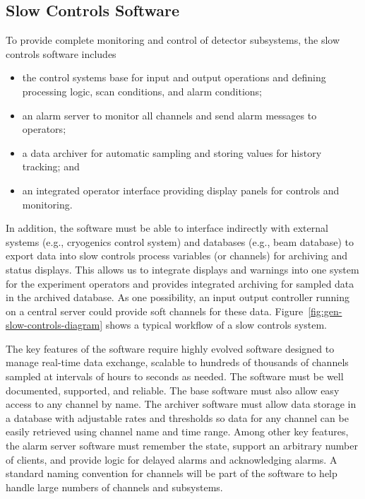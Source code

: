 \subsection{Slow Controls Software}
\label{sec:fdgen-slow-cryo-sw}


To provide complete monitoring and control of detector subsystems, the slow controls software includes
%
\begin{itemize}
 \item the control systems base for input and output operations
  and defining processing logic, scan conditions, and alarm conditions;
 \item an alarm server to monitor all channels and send alarm
  messages to operators;
 \item a data archiver for automatic sampling and storing values for history tracking; and 
 \item an integrated operator interface providing display panels for
  controls and monitoring.
\end{itemize}

In addition, the software must be able to 
interface indirectly with external systems (e.g., cryogenics control
system) and databases (e.g., beam database) to export data into
slow controls process variables (or channels) for archiving and status
displays. This allows us to integrate displays and warnings into one
system for the experiment operators and %
provides integrated
archiving for sampled data in the archived database. As one possibility, an input output controller running on a central 
server could provide soft channels for these data.
Figure~\ref{fig:gen-slow-controls-diagram} shows a typical workflow of a
slow controls system.

The key features of the software require highly evolved software designed to manage real-time data exchange, scalable
to hundreds of thousands of channels sampled at intervals of hours to seconds as needed. The software
must be well documented, supported, and reliable. The base
software must also allow easy access to any channel by name. The
archiver software must allow data storage in a database with
adjustable rates and thresholds so data
for any channel can be easily retrieved using channel name and time range. Among other key
features, the alarm server software must remember the state, support an
arbitrary number of clients, and provide logic for delayed alarms and
acknowledging alarms. A standard naming
convention for channels will be part of the software to help handle large
numbers of channels and subsystems.



